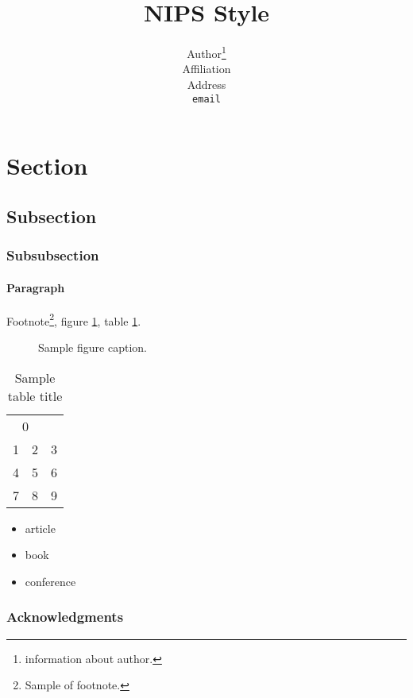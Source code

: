 \documentclass{article}
\title{NIPS Style}
\author{
  Author\thanks{information about author.} \\
  Affiliation \\
  Address \\
  \texttt{email} \\
}
\begin{document}
\maketitle

\begin{abstract}
\end{abstract}

\section{Section}

\subsection{Subsection}

\subsubsection{Subsubsection}

\paragraph{Paragraph}
Footnote\footnote{Sample of footnote.}, figure \ref{sample-figure}, table \ref{sample-table}.

\newpage

\begin{figure}
  \centering
  \fbox{\rule[-.5cm]{0cm}{4cm} \rule[-.5cm]{4cm}{0cm}}
  \caption{Sample figure caption.}
  \label{sample-figure}
\end{figure}

\begin{table}
  \caption{Sample table title}
  \label{sample-table}
  \centering
  \begin{tabular}{lll}
    \toprule
    \multicolumn{2}{c}{0} \\
    \cmidrule(r){1-2}
    1 & 2 & 3 \\
    \midrule
    4 & 5 & 6 \\
    7 & 8 & 9 \\
    \bottomrule
  \end{tabular}
\end{table}

\begin{itemize}

\item article \cite{Silver2016}

\item book \cite{Goodfellow2016}

\item conference \cite{Krizhevsky2012}

\end{itemize}

\subsubsection*{Acknowledgments}

\medskip
\small


\end{document}
